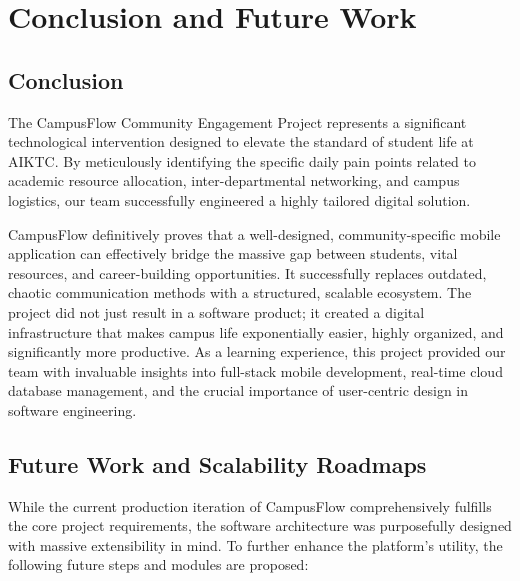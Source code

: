 \chapter{Conclusion and Future Work}

\section*{Conclusion}
The CampusFlow Community Engagement Project represents a significant technological intervention designed to elevate the standard of student life at AIKTC. By meticulously identifying the specific daily pain points related to academic resource allocation, inter-departmental networking, and campus logistics, our team successfully engineered a highly tailored digital solution. 

CampusFlow definitively proves that a well-designed, community-specific mobile application can effectively bridge the massive gap between students, vital resources, and career-building opportunities. It successfully replaces outdated, chaotic communication methods with a structured, scalable ecosystem. The project did not just result in a software product; it created a digital infrastructure that makes campus life exponentially easier, highly organized, and significantly more productive. As a learning experience, this project provided our team with invaluable insights into full-stack mobile development, real-time cloud database management, and the crucial importance of user-centric design in software engineering.

\section*{Future Work and Scalability Roadmaps}
While the current production iteration of CampusFlow comprehensively fulfills the core project requirements, the software architecture was purposefully designed with massive extensibility in mind. To further enhance the platform's utility, the following future steps and modules are proposed:

